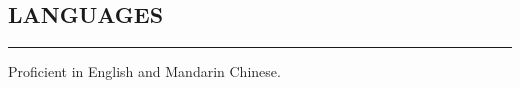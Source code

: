 \documentclass[10pt,letter]{article}
\begin{document}
\begin{small}
\begin{itemize}
\end{itemize}


\subsection*{LANGUAGES}
\hrule
\vspace{0.2cm}
\begin{list}{}{}
	\item  Proficient in English and Mandarin Chinese.
\end{list}


\vspace{0.1cm}







\end{small}
\end{document}
